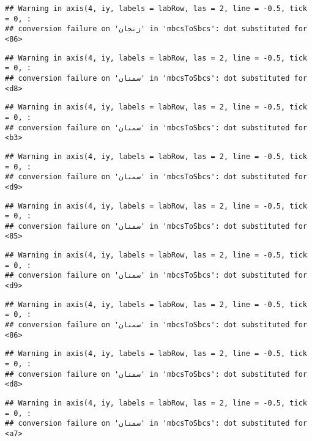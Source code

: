 \documentclass[
]{article}
\begin{document}
\begin{verbatim}
## Warning in axis(4, iy, labels = labRow, las = 2, line = -0.5, tick = 0, :
## conversion failure on 'زنجان' in 'mbcsToSbcs': dot substituted for <86>
\end{verbatim}

\begin{verbatim}
## Warning in axis(4, iy, labels = labRow, las = 2, line = -0.5, tick = 0, :
## conversion failure on 'سمنان' in 'mbcsToSbcs': dot substituted for <d8>
\end{verbatim}

\begin{verbatim}
## Warning in axis(4, iy, labels = labRow, las = 2, line = -0.5, tick = 0, :
## conversion failure on 'سمنان' in 'mbcsToSbcs': dot substituted for <b3>
\end{verbatim}

\begin{verbatim}
## Warning in axis(4, iy, labels = labRow, las = 2, line = -0.5, tick = 0, :
## conversion failure on 'سمنان' in 'mbcsToSbcs': dot substituted for <d9>
\end{verbatim}

\begin{verbatim}
## Warning in axis(4, iy, labels = labRow, las = 2, line = -0.5, tick = 0, :
## conversion failure on 'سمنان' in 'mbcsToSbcs': dot substituted for <85>
\end{verbatim}

\begin{verbatim}
## Warning in axis(4, iy, labels = labRow, las = 2, line = -0.5, tick = 0, :
## conversion failure on 'سمنان' in 'mbcsToSbcs': dot substituted for <d9>
\end{verbatim}

\begin{verbatim}
## Warning in axis(4, iy, labels = labRow, las = 2, line = -0.5, tick = 0, :
## conversion failure on 'سمنان' in 'mbcsToSbcs': dot substituted for <86>
\end{verbatim}

\begin{verbatim}
## Warning in axis(4, iy, labels = labRow, las = 2, line = -0.5, tick = 0, :
## conversion failure on 'سمنان' in 'mbcsToSbcs': dot substituted for <d8>
\end{verbatim}

\begin{verbatim}
## Warning in axis(4, iy, labels = labRow, las = 2, line = -0.5, tick = 0, :
## conversion failure on 'سمنان' in 'mbcsToSbcs': dot substituted for <a7>
\end{verbatim}
\end{document}
